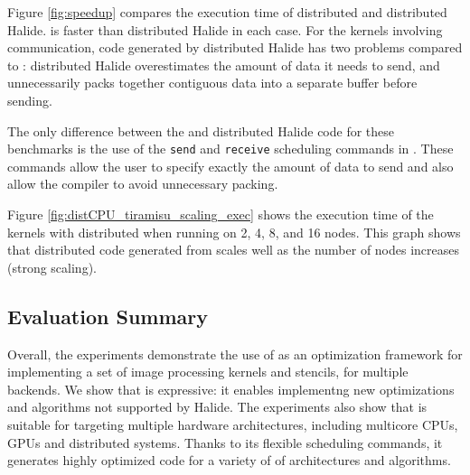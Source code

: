 Figure \ref{fig:speedup} compares the execution time of distributed \framework{} and distributed Halide. \framework{} is faster than distributed Halide in each case. For the kernels involving communication, code generated by distributed Halide has two problems compared to \framework{}:  distributed Halide overestimates the amount of data it needs to send, and unnecessarily packs together contiguous data into a separate buffer before sending.  %

The only difference between the \framework{} and distributed Halide code for these benchmarks is the use of the \texttt{send} and \texttt{receive} scheduling commands in \framework{}.  These commands allow the user to specify exactly the amount of data to send and also allow the compiler to avoid unnecessary packing.

Figure \ref{fig:distCPU_tiramisu_scaling_exec} shows the execution time of the kernels with distributed \framework{} when running on 2, 4, 8, and 16 nodes.  This graph shows that distributed code generated from \framework{} scales well as the number of nodes increases (strong scaling).

\vspace{-0.25cm}
\subsection{Evaluation Summary}

Overall, the experiments demonstrate the use of \framework as an optimization framework for implementing a set of image processing kernels and stencils, for multiple backends.  We show that \framework{} is expressive: it enables implementng new optimizations and algorithms not supported by Halide.  The experiments also show that \framework{} is suitable for targeting multiple hardware architectures, including multicore CPUs, GPUs and distributed systems. Thanks to its flexible scheduling commands, it generates highly optimized code for a variety of of architectures and algorithms.
